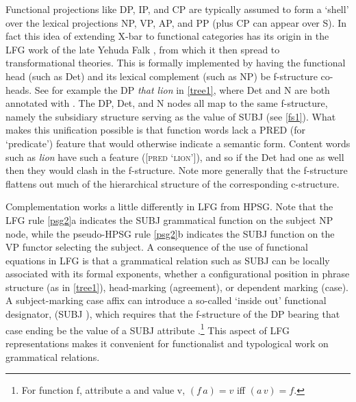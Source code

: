 Functional projections like DP, IP, and CP are typically assumed to form a `shell' over the lexical projections NP, VP, AP, and PP (plus CP can appear over S).  In fact this idea of extending X-bar to functional categories has its origin in the LFG work of the late Yehuda Falk \citep{Falk84a-u}, from which it then spread to  transformational theories.   This is formally implemented by having the functional head (such as Det) and its lexical complement (such as NP) be f-structure co-heads.  See for example the DP \textit{that lion} in \ref{tree1}, where Det and N are both annotated with \updown .  The DP, Det, and N nodes all map to the same f-structure, namely the subsidiary structure serving as the value of SUBJ (see \ref{fs1}).  What makes this unification possible is that function words lack a PRED (for `predicate') feature that would otherwise indicate a semantic form.  Content words such as \textit{lion} have such a feature ([\textsc{pred} `\textsc{lion}']), and so if the Det had one as well then they would clash in the f-structure.  Note more generally that the f-structure flattens out much of the hierarchical structure of the corresponding c-structure.  



Complementation works a little differently in LFG from HPSG.  Note that the LFG  rule \ref{psg2}a indicates the SUBJ grammatical function on the subject NP node, while the pseudo-HPSG rule \ref{psg2}b indicates the SUBJ function on the VP functor selecting the subject.   A consequence of the use of functional equations in LFG is that a grammatical relation such as SUBJ can be locally associated with its formal exponents, whether a configurational position in phrase structure (as in \ref{tree1}), head-marking (agreement), or dependent marking (case).  A subject-marking case affix can introduce a so-called `inside out' functional designator, (SUBJ \up), which requires that the f-structure of the DP bearing that case ending be the value of a SUBJ attribute \citep{Nordlinger98a-u}.\footnote{For function f, attribute a and value v, $(f \, a) = v$ iff $(a \, v) = f$.}  This aspect of LFG representations makes it convenient for functionalist and typological work on grammatical relations.  


 

